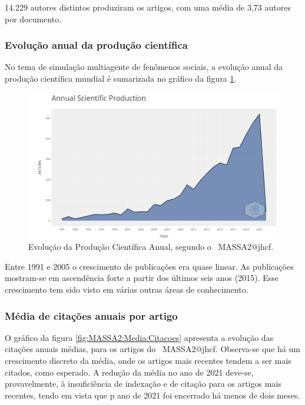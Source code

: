 14.229 autores distintos produziram os artigos, com uma média de 3,73 autores por documento.

\subsubsection{Evolução anual da produção científica}

No tema de simulação multiagente de fenômenos sociais, a evolução anual da produção científica mundial é sumarizada no gráfico da figura \ref{fig:MASSA2:Annual-Scientific-Production}.

\begin{figure}
    \centering
    \includegraphics[width=1\textwidth]{experiments/jhcf/PesqBibliogr/SimulacaoMultiagente/WoS-20220203/Descritiva/MASSA2-Annual-Scientific-Production.png}
    \caption{Evolução da Produção Científica Anual, segundo o \dataset\ MASSA2@jhcf.}
    \label{fig:MASSA2:Annual-Scientific-Production}
\end{figure}

Entre 1991 e 2005 o crescimento de publicações era quase linear. As publicações mostram-se em ascendência forte a partir dos últimos seis anos (2015). Esse crescimento tem sido visto em várias outras áreas de conhecimento.

\subsubsection{Média de citações anuais por artigo}

O gráfico da figura \ref{fig:MASSA2:Media:Citacoes} apresenta a evolução das citações anuais médias, para os artigos do \dataset\ MASSA2@jhcf. Observa-se que há um crescimento discreto da média, onde os artigos mais recentes tendem a ser mais citados, como esperado. A redução da média no ano de 2021 deve-se, provavelmente, à insuficiência de indexação e de citação para os artigos mais recentes, tendo em vista que p ano de 2021 foi encerrado há menos de dois meses. 

